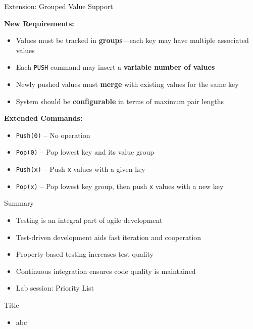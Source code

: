\begin{frame}{Extension: Grouped Value Support}
	
	\textbf{New Requirements:}
	\begin{itemize}
		\item Values must be tracked in \textbf{groups}—each key may have multiple associated values
		\item Each \texttt{PUSH} command may insert a \textbf{variable number of values}
		\item Newly pushed values must \textbf{merge} with existing values for the same key
		\item System should be \textbf{configurable} in terms of maximum pair lengths
	\end{itemize}
	
	\vspace{0.5em}
	\textbf{Extended Commands:}
	\begin{itemize}
		\item \texttt{Push(0)} – No operation
		\item \texttt{Pop(0)} – Pop lowest key and its value group
		\item \texttt{Push(x)} – Push \texttt{x} values with a given key
		\item \texttt{Pop(x)} – Pop lowest key group, then push \texttt{x} values with a new key
	\end{itemize}
	
\end{frame}

\begin{frame}{Summary}
	\begin{itemize}
		\item Testing is an integral part of agile development
		\item Test-driven development aids fast iteration and cooperation
		\item Property-based testing increases test quality
		\item Continuous integration ensures code quality is maintained
		\item Lab session: Priority List
	\end{itemize}
\end{frame}



\begin{frame}[fragile]{Title}
\begin{itemize}
\item abc
\end{itemize}
\end{frame}
